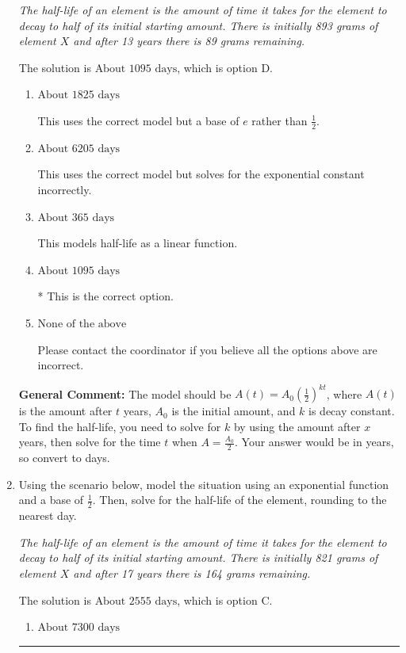\documentclass{extbook}[14pt]
\newcommand{\litem}[1]{\item #1

\rule{\textwidth}{0.4pt}}
\begin{document}
\begin{enumerate}
{\begin{center}
    \textit{ The half-life of an element is the amount of time it takes for the element to decay to half of its initial starting amount. There is initially 893 grams of element $X$ and after 13 years there is 89 grams remaining. }
\end{center}
The solution is \( \text{About } 1095 \text{ days} \), which is option D.\begin{enumerate}[label=\Alph*.]
\item \( \text{About } 1825 \text{ days} \)

This uses the correct model but a base of $e$ rather than $\frac{1}{2}$.
\item \( \text{About } 6205 \text{ days} \)

This uses the correct model but solves for the exponential constant incorrectly.
\item \( \text{About } 365 \text{ days} \)

This models half-life as a linear function.
\item \( \text{About } 1095 \text{ days} \)

* This is the correct option.
\item \( \text{None of the above} \)

Please contact the coordinator if you believe all the options above are incorrect.
\end{enumerate}

\textbf{General Comment:} The model should be $A(t) = A_0 (\frac{1}{2})^{kt}$, where $A(t)$ is the amount after $t$ years, $A_0$ is the initial amount, and $k$ is decay constant. To find the half-life, you need to solve for $k$ by using the amount after $x$ years, then solve for the time $t$ when $A = \frac{A_0}{2}$. Your answer would be in years, so convert to days.
}
\litem{
Using the scenario below, model the situation using an exponential function and a base of $\frac{1}{2}$. Then, solve for the half-life of the element, rounding to the nearest day.

\begin{center}
    \textit{ The half-life of an element is the amount of time it takes for the element to decay to half of its initial starting amount. There is initially 821 grams of element $X$ and after 17 years there is 164 grams remaining. }
\end{center}
The solution is \( \text{About } 2555 \text{ days} \), which is option C.\begin{enumerate}[label=\Alph*.]
\item \( \text{About } 7300 \text{ days} \)


\end{enumerate}}
\end{enumerate}
\end{document}
